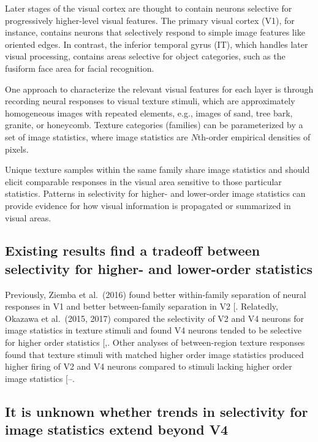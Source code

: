 \documentclass[
  11pt,
  letterpaper,
  DIV=11,
  numbers=noendperiod]{scrartcl}
\begin{document}
Later stages of the visual cortex are thought to contain neurons
selective for progressively higher-level visual features. The primary
visual cortex (V1), for instance, contains neurons that selectively
respond to simple image features like oriented edges. In contrast, the
inferior temporal gyrus (IT), which handles later visual processing,
contains areas selective for object categories, such as the fusiform
face area for facial recognition.

One approach to characterize the relevant visual features for each layer
is through recording neural responses to visual texture stimuli, which
are approximately homogeneous images with repeated elements, e.g.,
images of sand, tree bark, granite, or honeycomb. Texture categories
(families) can be parameterized by a set of image statistics, where
image statistics are \(N\)th-order empirical densities of pixels.

Unique texture samples within the same family share image statistics and
should elicit comparable responses in the visual area sensitive to those
particular statistics. Patterns in selectivity for higher- and
lower-order image statistics can provide evidence for how visual
information is propagated or summarized in visual areas.

\subsection{Existing results find a tradeoff between selectivity for
higher- and lower-order
statistics}\label{existing-results-find-a-tradeoff-between-selectivity-for-higher--and-lower-order-statistics}

Previously, Ziemba et al.~(2016) found better within-family separation
of neural responses in V1 and better between-family separation in V2
{[}\citeproc{ref-ziemba_selectivity_2016}{1}{]}. Relatedly, Okazawa et
al.~(2015, 2017) compared the selectivity of V2 and V4 neurons for image
statistics in texture stimuli and found V4 neurons tended to be
selective for higher order statistics
{[},\citeproc{ref-okazawa_gradual_2017}{6}{]}.
Other analyses of between-region texture responses found that texture
stimuli with matched higher order image statistics produced higher
firing of V2 and V4 neurons compared to stimuli lacking higher order
image statistics
{[}--\citeproc{ref-lee_emergence_2025}{4}{]}.

\subsection{It is unknown whether trends in selectivity for image
statistics extend beyond
V4}\label{it-is-unknown-whether-trends-in-selectivity-for-image-statistics-extend-beyond-v4}
\end{document}
